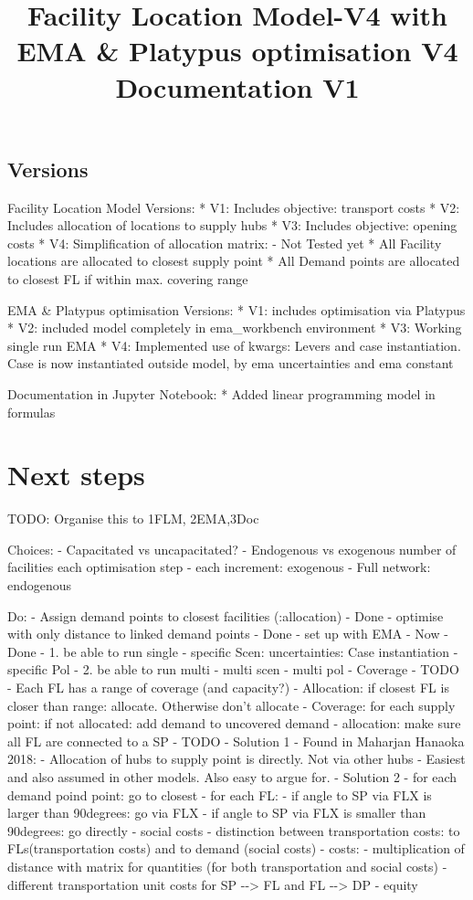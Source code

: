 \documentclass[11pt]{article}
\title{Facility Location Model-V4 with EMA \& Platypus optimisation V4 Documentation V1}
\begin{document}
    
    
    \maketitle
    
    

    
    \subsection{Versions}\label{versions}

Facility Location Model Versions: * V1: Includes objective: transport
costs * V2: Includes allocation of locations to supply hubs * V3:
Includes objective: opening costs * V4: Simplification of allocation
matrix: - Not Tested yet * All Facility locations are allocated to
closest supply point * All Demand points are allocated to closest FL if
within max. covering range

EMA \& Platypus optimisation Versions: * V1: includes optimisation via
Platypus * V2: included model completely in ema\_workbench environment *
V3: Working single run EMA * V4: Implemented use of kwargs: Levers and
case instantiation. Case is now instantiated outside model, by ema
uncertainties and ema constant

Documentation in Jupyter Notebook: * Added linear programming model in
formulas

    \section{Next steps}\label{next-steps}

    TODO: Organise this to 1FLM, 2EMA,3Doc

Choices: - Capacitated vs uncapacitated? - Endogenous vs exogenous
number of facilities each optimisation step - each increment: exogenous
- Full network: endogenous

Do: - Assign demand points to closest facilities (:allocation) - Done -
optimise with only distance to linked demand points - Done - set up with
EMA - Now - Done - 1. be able to run single - specific Scen:
uncertainties: Case instantiation - specific Pol - 2. be able to run
multi - multi scen - multi pol - Coverage - TODO - Each FL has a range
of coverage (and capacity?) - Allocation: if closest FL is closer than
range: allocate. Otherwise don't allocate - Coverage: for each supply
point: if not allocated: add demand to uncovered demand - allocation:
make sure all FL are connected to a SP - TODO - Solution 1 - Found in
Maharjan Hanaoka 2018: - Allocation of hubs to supply point is directly.
Not via other hubs - Easiest and also assumed in other models. Also easy
to argue for. - Solution 2 - for each demand poind point: go to closest
- for each FL: - if angle to SP via FLX is larger than 90degrees: go via
FLX - if angle to SP via FLX is smaller than 90degrees: go directly -
social costs - distinction between transportation costs: to
FLs(transportation costs) and to demand (social costs) - costs: -
multiplication of distance with matrix for quantities (for both
transportation and social costs) - different transportation unit costs
for SP -\/-\textgreater{} FL and FL -\/-\textgreater{} DP - equity
\end{document}
